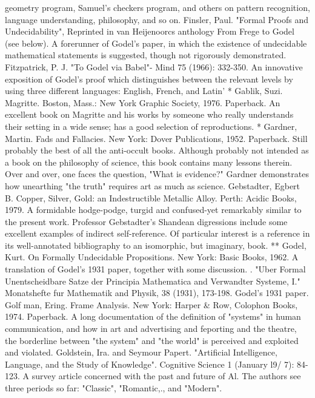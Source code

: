   geometry program, Samuel's checkers program, and others on pattern recognition,
  language understanding, philosophy, and so on.
Finsler, Paul. "Formal Proofs and Undecidability", Reprinted in van Heijenoorcs
  anthology From Frege to Godel (see below). A forerunner of Godel's paper, in which
  the existence of undecidable mathematical statements is suggested, though not
  rigorously demonstrated.
Fitzpatrick, P. J. "To Godel via Babel"- Mind 75 (1966): 332-350. An innovative
  exposition of Godel's proof which distinguishes between the relevant levels by using
  three different languages: English, French, and Latin'
* Gablik, Suzi. Magritte. Boston, Mass.: New York Graphic Society, 1976. Paperback.
  An excellent book on Magritte and his works by someone who really understands their
  setting in a wide sense; has a good selection of reproductions.
* Gardner, Martin. Fads and Fallacies. New York: Dover Publications, 1952. Paperback.
  Still probably the best of all the anti-occult books. Although probably not intended as a
  book on the philosophy of science, this book contains many lessons therein. Over and
  over, one faces the question, "What is evidence?" Gardner demonstrates how
  unearthing "the truth" requires art as much as science.
Gebstadter, Egbert B. Copper, Silver, Gold: an Indestructible Metallic Alloy. Perth:
  Acidic Books, 1979. A formidable hodge-podge, turgid and confused-yet remarkably
  similar to the present work. Professor Gebstadter's Shandean digressions include some
  excellent examples of indirect self-reference. Of particular interest is a reference in its
  well-annotated bibliography to an isomorphic, but imaginary, book.
** Godel, Kurt. On Formally Undecidable Propositions. New York: Basic Books, 1962.
  A translation of Godel's 1931 paper, together with some discussion.
. "Uber Formal Unentscheidbare Satze der Principia Mathematica and Verwandter
  Systeme, I." Monatshefte fur Mathematik and Physik, 38 (1931), 173-198. Godel's
  1931 paper.
Golf man, Ering. Frame Analysis. New York: Harper \& Row, Colophon Books, 1974.
  Paperback. A long documentation of the definition of "systems" in human
  communication, and how in art and advertising and feporting and the theatre, the
  borderline between "the system" and "the world" is perceived and exploited and
  violated.
Goldstein, Ira. and Seymour Papert. "Artificial Intelligence, Language, and the Study of
  Knowledge". Cognitive Science 1 (January l9/ 7): 84-123. A survey article concerned
  with the past and future of Al. The authors see three periods so far: "Classic",
  "Romantic,., and "Modern".
